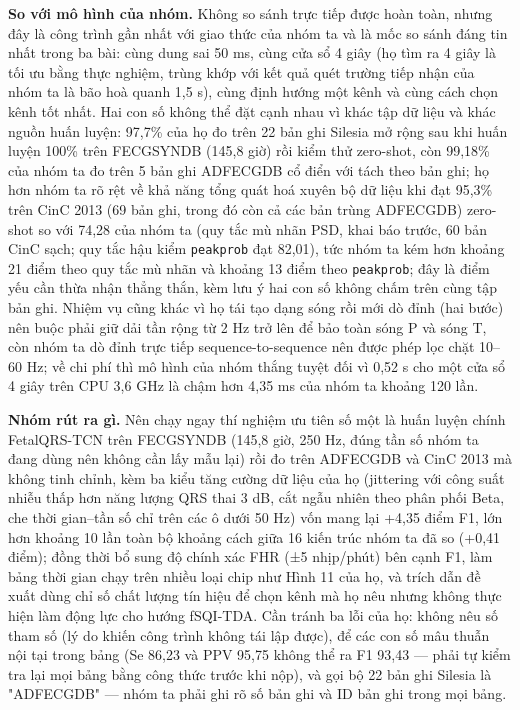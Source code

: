 \documentclass[12pt,a4paper]{article}
\begin{document}
\noindent \textbf{\color{tdtblue}So với mô hình của nhóm.} Không so sánh trực tiếp được hoàn toàn, nhưng đây là công trình gần nhất với giao thức của nhóm ta và là mốc so sánh đáng tin nhất trong ba bài: cùng dung sai 50 ms, cùng cửa sổ 4 giây (họ tìm ra 4 giây là tối ưu bằng thực nghiệm, trùng khớp với kết quả quét trường tiếp nhận của nhóm ta là bão hoà quanh 1,5 s), cùng định hướng một kênh và cùng cách chọn kênh tốt nhất. Hai con số không thể đặt cạnh nhau vì khác tập dữ liệu và khác nguồn huấn luyện: 97,7\% của họ đo trên 22 bản ghi Silesia mở rộng sau khi huấn luyện 100\% trên FECGSYNDB (145,8 giờ) rồi kiểm thử zero-shot, còn 99,18\% của nhóm ta đo trên 5 bản ghi ADFECGDB cổ điển với tách theo bản ghi; họ hơn nhóm ta rõ rệt về khả năng tổng quát hoá xuyên bộ dữ liệu khi đạt 95,3\% trên CinC 2013 (69 bản ghi, trong đó còn cả các bản trùng ADFECGDB) zero-shot so với 74,28 của nhóm ta (quy tắc mù nhãn PSD, khai báo trước, 60 bản CinC sạch; quy tắc hậu kiểm \texttt{peakprob} đạt 82,01), tức nhóm ta kém hơn khoảng 21 điểm theo quy tắc mù nhãn và khoảng 13 điểm theo \texttt{peakprob}; đây là điểm yếu cần thừa nhận thẳng thắn, kèm lưu ý hai con số không chấm trên cùng tập bản ghi. Nhiệm vụ cũng khác vì họ tái tạo dạng sóng rồi mới dò đỉnh (hai bước) nên buộc phải giữ dải tần rộng từ 2 Hz trở lên để bảo toàn sóng P và sóng T, còn nhóm ta dò đỉnh trực tiếp sequence-to-sequence nên được phép lọc chặt 10–60 Hz; về chi phí thì mô hình của nhóm thắng tuyệt đối vì 0,52 s cho một cửa sổ 4 giây trên CPU 3,6 GHz là chậm hơn 4,35 ms của nhóm ta khoảng 120 lần.\par\vspace{3pt}
\noindent \textbf{\color{tdtblue}Nhóm rút ra gì.} Nên chạy ngay thí nghiệm ưu tiên số một là huấn luyện chính FetalQRS-TCN trên FECGSYNDB (145,8 giờ, 250 Hz, đúng tần số nhóm ta đang dùng nên không cần lấy mẫu lại) rồi đo trên ADFECGDB và CinC 2013 mà không tinh chỉnh, kèm ba kiểu tăng cường dữ liệu của họ (jittering với công suất nhiễu thấp hơn năng lượng QRS thai 3 dB, cắt ngẫu nhiên theo phân phối Beta, che thời gian–tần số chỉ trên các ô dưới 50 Hz) vốn mang lại +4,35 điểm F1, lớn hơn khoảng 10 lần toàn bộ khoảng cách giữa 16 kiến trúc nhóm ta đã so (+0,41 điểm); đồng thời bổ sung độ chính xác FHR (±5 nhịp/phút) bên cạnh F1, làm bảng thời gian chạy trên nhiều loại chip như Hình 11 của họ, và trích dẫn đề xuất dùng chỉ số chất lượng tín hiệu để chọn kênh mà họ nêu nhưng không thực hiện làm động lực cho hướng fSQI-TDA. Cần tránh ba lỗi của họ: không nêu số tham số (lý do khiến công trình không tái lập được), để các con số mâu thuẫn nội tại trong bảng (Se 86,23 và PPV 95,75 không thể ra F1 93,43 — phải tự kiểm tra lại mọi bảng bằng công thức trước khi nộp), và gọi bộ 22 bản ghi Silesia là "ADFECGDB" — nhóm ta phải ghi rõ số bản ghi và ID bản ghi trong mọi bảng.\par\vspace{3pt}
\vspace{6pt}
\end{document}
